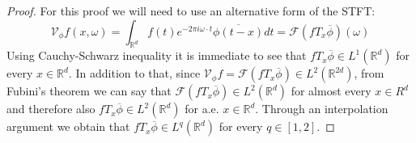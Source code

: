 \documentclass[corpo=11pt, stile=classica, tipotesi=custom,
greek, evenboxes, english]{toptesi}
\numberwithin{equation}{chapter}
\theoremstyle{remark}
\newcommand{\R}{\mathbb{R}} %
\newcommand{\V}{\mathcal{V}} %
\newcommand{\F}{\mathscr{F}} %
\begin{document}
\begin{proof}
	For this proof we will need to use an alternative form of the STFT:
	\begin{equation*}
		\V_{\phi} f(x,\omega) = \int_{\R^d} f(t) e^{-2\pi i \omega \cdot t} \overline{\phi(t-x)}dt = \F(f T_x \overline{\phi})(\omega)
	\end{equation*}
	Using Cauchy-Schwarz inequality it is immediate to see that $f T_x \overline{\phi} \in L^1(\R^d)$ for every $x \in \R^d$. In addition to that, since $\V_{\phi} f = \F(f T_x \overline{\phi}) \in L^2(\R^{2d})$, from Fubini's theorem we can say that $ \F(f T_x \overline{\phi}) \in L^2(\R^d) $ for almost every $x \in R^d$ and therefore also $f T_x \overline{\phi} \in L^2(\R^d)$ for a.e. $x \in \R^d$. Through an interpolation argument we obtain that $f T_x \overline{\phi} \in L^q(\R^d)$ for every $q \in [1,2]$.
	

\end{proof}
\end{document}
